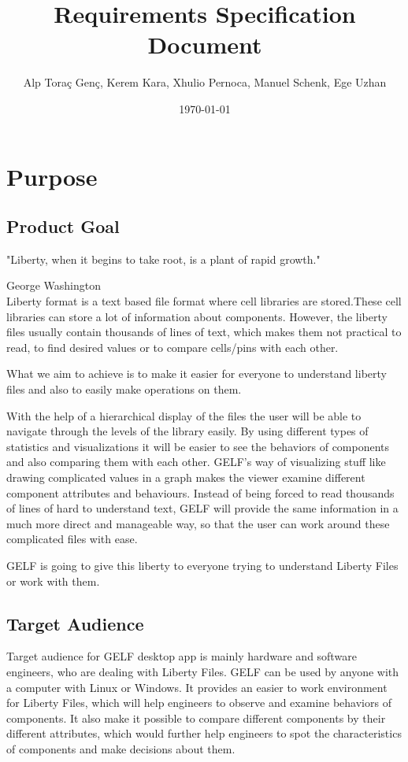 \documentclass[10pt,a4paper]{report}
\title{Requirements Specification Document}
\author{Alp Toraç Genç, Kerem Kara, Xhulio Pernoca, Manuel Schenk, Ege Uzhan}
\date{\today}
\begin{document}
\maketitle
\label{sec:title}
\tableofcontents

\chapter{Purpose}
\section{Product Goal}
\bigskip
"Liberty, when it begins to take root, is a plant of rapid growth." 

George Washington \\


Liberty format is a text based file format where cell libraries are stored.These cell libraries can store  a lot of information about components. However, the liberty files usually contain thousands of lines of text, which makes them not practical to read, to find desired values or to compare cells/pins with each other. \bigskip

What we aim to achieve is to make it easier for everyone to understand liberty files and also to easily make operations on them.  \bigskip

With the help of a hierarchical display of the files the user will be able to navigate through the levels of the library easily. By using different types of statistics and visualizations it will be easier to see the behaviors of components and also comparing them with each other. GELF's way of visualizing stuff like drawing complicated values in a graph makes the viewer examine different component attributes and behaviours. Instead of being forced to read thousands of lines of hard to understand text, GELF will provide the same information in a much more direct and manageable way, so that the user can work around these complicated files with ease.\bigskip

GELF is going to give this liberty to everyone trying to understand Liberty Files or work with them.
\section{Target Audience}
Target audience for GELF desktop app is mainly hardware and software engineers, who are dealing with Liberty Files. GELF can be used by anyone with a computer with Linux or Windows. It provides an easier to work environment for Liberty Files, which will help engineers to observe and examine behaviors of components. It also make it possible to compare different components by their different attributes, which would further help engineers to spot the characteristics of components and make decisions about them.
\end{document}
